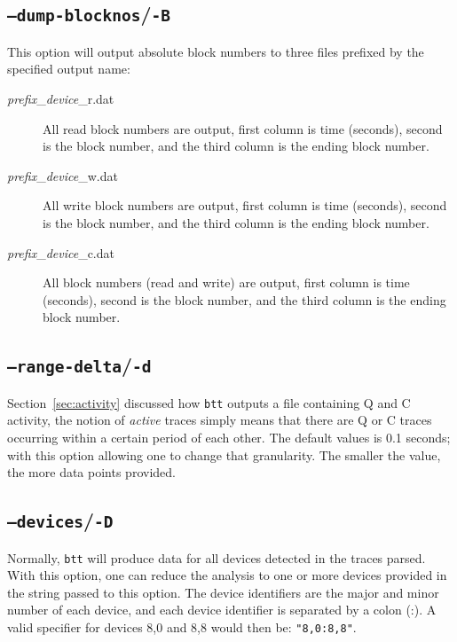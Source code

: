 \documentclass{article}
\begin{document}
\subsection{\label{sec:o-B}\texttt{--dump-blocknos}/\texttt{-B}}

  This option will output absolute block numbers to three files prefixed
  by the specified output name:

  \begin{description}
    \item[\emph{prefix}\_\emph{device}\_r.dat] All read block numbers are
    output, first column is time (seconds), second is the block number,
    and the third column is the ending block number.

    \item[\emph{prefix}\_\emph{device}\_w.dat] All write block numbers are
    output, first column is time (seconds), second is the block number,
    and the third column is the ending block number.

    \item[\emph{prefix}\_\emph{device}\_c.dat] All block numbers (read
    and write) are output, first column is time (seconds), second is
    the block number, and the third column is the ending block number.
  \end{description}

\subsection{\label{sec:o-d}\texttt{--range-delta}/\texttt{-d}}

  Section~\ref{sec:activity} discussed how \texttt{btt} outputs a file
  containing Q and C activity, the notion of \emph{active} traces simply
  means that there are Q or C traces occurring within a certain period
  of each other. The default values is 0.1 seconds; with this option
  allowing one to change that granularity. The smaller the value, the
  more data points provided.

\subsection{\label{sec:o-D}\texttt{--devices}/\texttt{-D}}

  Normally, \texttt{btt} will produce data for all devices detected in
  the traces parsed. With this option, one can reduce the analysis to
  one or more devices provided in the string passed to this option. The
  device identifiers are the major and minor number of each device, and
  each device identifier is separated by a colon (:). A valid specifier
  for devices 8,0 and 8,8 would then be: \texttt{"8,0:8,8"}.
\end{document}
